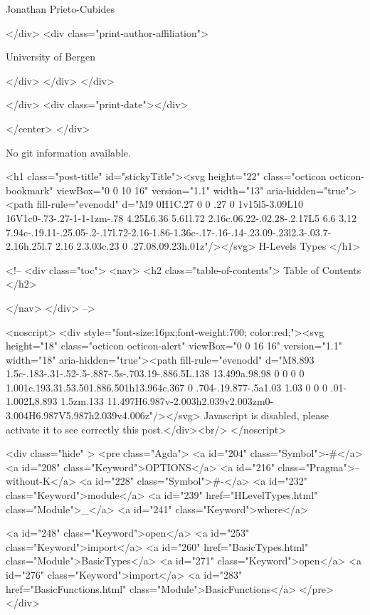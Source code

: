                   Jonathan Prieto-Cubides
                
              </div>
              <div class="print-author-affiliation">
                
                  University of Bergen
                
                </div>
            </div>
          </div>
          
          
        </div>
        <div class="print-date"></div>
        
        
    </center>
  </div>

  
  No git information available.
  
  <h1 class="post-title" id="stickyTitle"><svg height="22" class="octicon octicon-bookmark" viewBox="0 0 10 16" version="1.1" width="13" aria-hidden="true"><path fill-rule="evenodd" d="M9 0H1C.27 0 0 .27 0 1v15l5-3.09L10 16V1c0-.73-.27-1-1-1zm-.78 4.25L6.36 5.61l.72 2.16c.06.22-.02.28-.2.17L5 6.6 3.12 7.94c-.19.11-.25.05-.2-.17l.72-2.16-1.86-1.36c-.17-.16-.14-.23.09-.23l2.3-.03.7-2.16h.25l.7 2.16 2.3.03c.23 0 .27.08.09.23h.01z"/></svg> H-Levels Types
  </h1>

  <!-- 
  <div class="toc">
    <nav>
    <h2 class="table-of-contents"> Table of Contents </h2>
      

    </nav>
  </div>
   -->

  <noscript>
  <div style="font-size:16px;font-weight:700; color:red;"><svg height="18" class="octicon octicon-alert" viewBox="0 0 16 16" version="1.1" width="18" aria-hidden="true"><path fill-rule="evenodd" d="M8.893 1.5c-.183-.31-.52-.5-.887-.5s-.703.19-.886.5L.138 13.499a.98.98 0 0 0 0 1.001c.193.31.53.501.886.501h13.964c.367 0 .704-.19.877-.5a1.03 1.03 0 0 0 .01-1.002L8.893 1.5zm.133 11.497H6.987v-2.003h2.039v2.003zm0-3.004H6.987V5.987h2.039v4.006z"/></svg> Javascript is disabled, please activate it to see correctly this post.</div><br/>
  </noscript>

  <div class="hide" >
<pre class="Agda">
<a id="204" class="Symbol">{-#</a> <a id="208" class="Keyword">OPTIONS</a> <a id="216" class="Pragma">--without-K</a> <a id="228" class="Symbol">#-}</a>
<a id="232" class="Keyword">module</a> <a id="239" href="HLevelTypes.html" class="Module">_</a> <a id="241" class="Keyword">where</a>

<a id="248" class="Keyword">open</a> <a id="253" class="Keyword">import</a> <a id="260" href="BasicTypes.html" class="Module">BasicTypes</a>
<a id="271" class="Keyword">open</a> <a id="276" class="Keyword">import</a> <a id="283" href="BasicFunctions.html" class="Module">BasicFunctions</a>
</pre>
</div>


